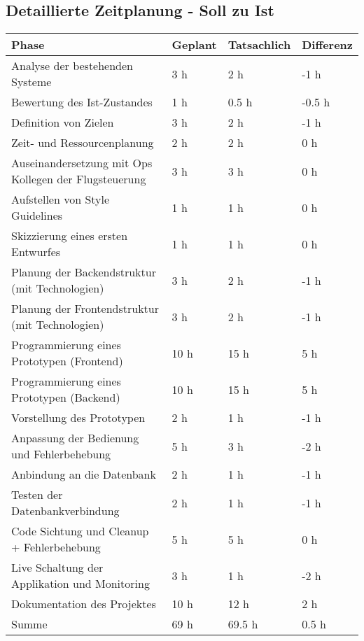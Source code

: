 \begin{appendices}
\section{Detaillierte Zeitplanung - Soll zu Ist}

\begin{table}[htp]

	\begin{center}
		\begin{tabular}{llll} \toprule
			Phase & Geplant & Tatsachlich & Differenz\\ \bottomrule
			Analyse der bestehenden Systeme & 3 h & 2 h & -1 h \\
			Bewertung des Ist-Zustandes & 1 h & 0.5 h & -0.5 h \\
			Definition von Zielen & 3 h & 2 h & -1 h \\
			Zeit- und Ressourcenplanung & 2 h & 2 h & 0 h \\
			Auseinandersetzung mit Ops Kollegen der Flugsteuerung & 3 h & 3 h & 0 h \\
			Aufstellen von Style Guidelines & 1 h & 1 h & 0 h \\
			Skizzierung eines ersten Entwurfes & 1 h & 1 h & 0 h \\
			Planung der Backendstruktur (mit Technologien) & 3 h & 2 h & -1 h \\
			Planung der Frontendstruktur (mit Technologien) & 3 h & 2 h & -1 h \\
			Programmierung eines Prototypen (Frontend) & 10 h & 15 h & 5 h \\
			Programmierung eines Prototypen (Backend) & 10 h & 15 h & 5 h \\
			Vorstellung des Prototypen & 2 h & 1 h & -1 h \\
			Anpassung der Bedienung und Fehlerbehebung & 5 h & 3 h & -2 h \\
			Anbindung an die Datenbank & 2 h & 1 h & -1 h \\
			Testen der Datenbankverbindung & 2 h & 1 h & -1 h \\
			Code Sichtung und Cleanup + Fehlerbehebung & 5 h & 5 h & 0 h \\
			Live Schaltung der Applikation und Monitoring & 3 h & 1 h & -2 h \\
			Dokumentation des Projektes & 10 h & 12 h & 2 h \\ \bottomrule
		
			Summe & 69 h & 69.5 h & 0.5 h \\
		\end{tabular}
	\end{center}
\end{table}
\newpage


\end{appendices}
